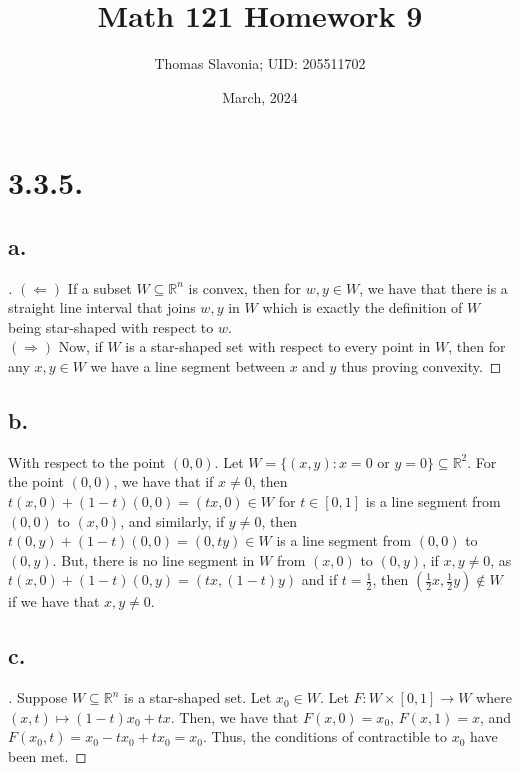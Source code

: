 \documentclass{article}
\title{Math 121 Homework 9}
\author{Thomas Slavonia; UID: 205511702}
\date{March, 2024}
\begin{document}
\maketitle

\section*{3.3.5.}
\subsection*{a.}
\begin{proof}[\unskip\nopunct]
   $(\Leftarrow)$ If a subset $W \subseteq \mathbb{R}^n$ is
   convex, then for $w, y \in W$, we have that there is a straight line interval that joins $w, y$ in $W$
   which is exactly the definition of $W$ being star-shaped
   with respect to $w$. \\
   $(\Rightarrow)$ Now, if $W$ is a star-shaped set with respect to every point in $W$, then for any $x, y \in W$ we have a line segment between $x$ and $y$ thus proving convexity. 

  



\end{proof}
\subsection*{b.}
With respect to the point $(0, 0)$. Let $W = \{(x, y) : x = 0 \text{ or } y = 0\} \subseteq \mathbb{R}^2$. For the point $(0, 0)$, we have that if $x \neq 0$, then $t(x, 0) + (1 - t)(0, 0) = (tx, 0) \in W$ for $t \in [0, 1]$ is a line segment from $(0, 0)$ to $(x, 0)$, and similarly, if $y \neq 0$, then $t(0, y) + (1- t)(0, 0) = (0, ty) \in W$ is a line segment from $(0, 0)$ to $(0, y)$. 
But, there is no line segment in $W$ from $(x, 0)$ to $(0, y)$, if $x, y \neq 0$, as $t(x, 0) + (1 - t)(0, y) = (tx, (1 - t)y)$ and if $t = \frac{1}{2}$, then $(\frac{1}{2}x, \frac{1}{2}y) \notin W$ if we have that $x, y \neq 0$.  

\subsection*{c.}
\begin{proof}[\unskip\nopunct]
Suppose $W \subseteq \mathbb{R}^n$ is a star-shaped set. 
Let $x_0 \in W$. 
Let $F:W \times [0, 1] \to W$ where $(x, t) \mapsto (1 - t)x_0 +tx$. Then, we have that $F(x, 0) = x_0$, $F(x, 1) = x$, and $F(x_0, t) = x_0 - tx_0 + tx_0 =x_0$. 
Thus, the conditions of contractible to $x_0$ have been met. 

\end{proof}
\end{document}
